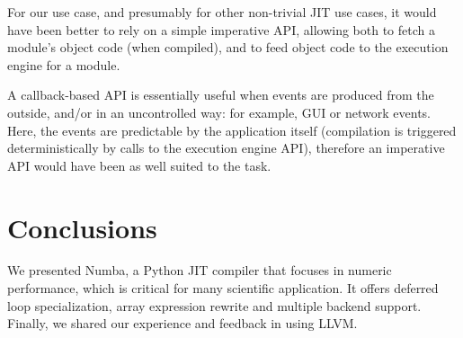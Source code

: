 \documentclass{acm_proc_article-sp}
\begin{document}
For our use case, and presumably for other non-trivial JIT use cases,
it would have been better to rely on a simple imperative API, allowing
both to fetch a module's object code (when compiled), and to feed object
code to the execution engine for a module.

A callback-based API is essentially useful when events are produced from
the outside, and/or in an uncontrolled way: for example, GUI or network
events.  Here, the events are predictable by the application
itself (compilation is triggered deterministically by calls to the
execution engine API), therefore an imperative API would have been as
well suited to the task.

\section{Conclusions}

We presented Numba, a Python JIT compiler that focuses in numeric
performance, which is critical for many scientific application. It offers
deferred loop specialization, array expression rewrite and multiple backend
support. Finally, we shared our experience and feedback in using LLVM.



%

%
%


\end{document}
